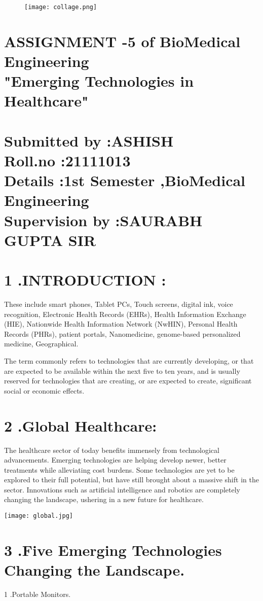 \documentclass[12pt]{article}
\begin{document}
\begin{figure}

\centering
\texttt{[image: collage.png]}

\end{figure}

\section*{ASSIGNMENT -5 of BioMedical Engineering\\"Emerging Technologies in Healthcare"\\\\Submitted by :ASHISH\\Roll.no :21111013\\Details :1st Semester ,BioMedical Engineering\\Supervision by :SAURABH GUPTA SIR}

\clearpage
\section*{ 1 .INTRODUCTION :}
These include smart phones, Tablet PCs, Touch screens, digital ink, voice recognition, Electronic Health Records (EHRs), Health Information Exchange (HIE), Nationwide Health Information Network (NwHIN), Personal Health Records (PHRs), patient portals, Nanomedicine, genome-based personalized medicine, Geographical.


The term commonly refers to technologies that are currently developing, or that are expected to be available within the next five to ten years, and is usually reserved for technologies that are creating, or are expected to create, significant social or economic effects.

\section*{ 2 .Global Healthcare: }
The healthcare sector of today benefits immensely from technological advancements. Emerging technologies are helping develop newer, better treatments while alleviating cost burdens. Some technologies are yet to be explored to their full potential, but have still brought about a massive shift in the sector. Innovations such as artificial intelligence and robotics are completely changing the landscape, ushering in a new future for healthcare.

\centering
\texttt{[image: global.jpg]}

\clearpage
\section*{ 3 .Five Emerging Technologies Changing the Landscape.}
 1 .Portable Monitors.
  
\end{document}
